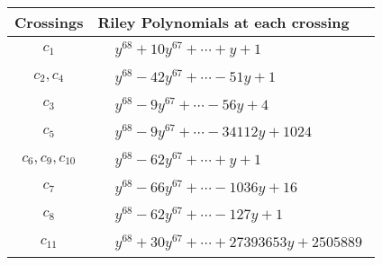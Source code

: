 \documentclass[1p]{elsarticle_modified}
\theoremstyle{definition}
\begin{document}
\begin{tabular}{m{50pt}|m{274pt}}
Crossings & \hspace{64pt}Riley Polynomials at each crossing \\
\hline $$\begin{aligned}c_{1}\end{aligned}$$&$\begin{aligned}
&y^{68}+10 y^{67}+\cdots+y+1
\end{aligned}$\\
\hline $$\begin{aligned}c_{2},c_{4}\end{aligned}$$&$\begin{aligned}
&y^{68}-42 y^{67}+\cdots-51 y+1
\end{aligned}$\\
\hline $$\begin{aligned}c_{3}\end{aligned}$$&$\begin{aligned}
&y^{68}-9 y^{67}+\cdots-56 y+4
\end{aligned}$\\
\hline $$\begin{aligned}c_{5}\end{aligned}$$&$\begin{aligned}
&y^{68}-9 y^{67}+\cdots-34112 y+1024
\end{aligned}$\\
\hline $$\begin{aligned}c_{6},c_{9},c_{10}\end{aligned}$$&$\begin{aligned}
&y^{68}-62 y^{67}+\cdots+y+1
\end{aligned}$\\
\hline $$\begin{aligned}c_{7}\end{aligned}$$&$\begin{aligned}
&y^{68}-66 y^{67}+\cdots-1036 y+16
\end{aligned}$\\
\hline $$\begin{aligned}c_{8}\end{aligned}$$&$\begin{aligned}
&y^{68}-62 y^{67}+\cdots-127 y+1
\end{aligned}$\\
\hline $$\begin{aligned}c_{11}\end{aligned}$$&$\begin{aligned}
&y^{68}+30 y^{67}+\cdots+27393653 y+2505889
\end{aligned}$\\
\hline
\end{tabular}\\~\\
\end{document}
